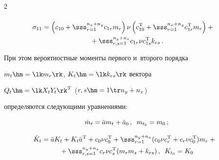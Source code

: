 \begin{multicols}{2}
\begin{multline*}

\end{multline*}






\noindent

\begin{multline*}

\hspace*{-9.60526pt}\sigma_{11}= \left( c_{10} +\sss_{r=1}^{n_x+n_y} c_{1r} m_{r}\right) \nu

     \left( c_{10}^{\mathrm{T}} +\sss_{r=1}^{n_x+n_y} c_{1r}^{\mathrm{T}} m_{r}\right)+{}\\

{}+\sss_{r,s=1}^{n_y+n_x} c_{1r}\nu c_{1s}^{\mathrm{T}} k_{rs}\,. %

\end{multline*}

При этом вероятностные моменты первого и~второго порядка

$m_t \hm=\lk m_r\rk$, $K_t \hm=\lk k_{rs}\rk$ вектора

$Q_t \hm= \lk X_t Y_t\rk^{\mathrm{T}}$ ($r, s \hm=1\tr n_y+n_x$)

определяются следующими уравнениями:

\begin{equation}

\dot m_t = \bar a m_t+\bar a_0\,,\enskip m_{t_0}= m_0\,;\label{e2.11-sk}

\end{equation}



\vspace*{-14pt}



\noindent

\begin{multline}

\hspace*{-4.38786pt}\dot K_t = \bar a K_t + K_t \bar a^{\mathrm{T}} + c_0\nu c_0^{\mathrm{T}} +\sss_{r=1}^{n_y+n_x}

 (c_0\nu c_r^{\mathrm{T}} + c_r \nu c_0^{\mathrm{T}})m_r+{}\\

{}+ \sss_{r,s=1}^{n_y+n_x} c_r \nu c_s^{\mathrm{T}} (m_rm_s + k_{rs})\,,

\enskip K_{t_0}=K_0\label{e2.12-sk}


\end{multline}
\end{multicols}

